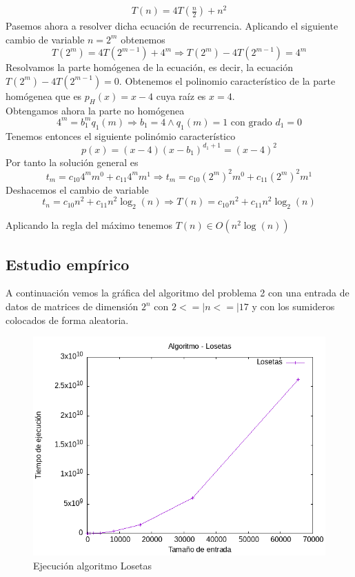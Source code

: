 \documentclass[11pt,openany]{book}
\begin{document}
\begin{gather*}
      T(n)= 4T(\frac{n}{2})+n^2
\end{gather*}
Pasemos ahora a resolver dicha ecuación de recurrencia. Aplicando el siguiente cambio de variable $n=2^m$ obtenemos
\begin{equation*}
      T(2^m)=4T(2^{m-1})+4^m \Rightarrow T(2^m)-4T(2^{m-1})=4^m
\end{equation*}
  Resolvamos la parte homógenea de la ecuación, es decir, la ecuación $T(2^m)-4T(2^{m-1})=0$. Obtenemos el polinomio
  característico de la parte homógenea que es $p_H(x)=x-4$ cuya raíz es $x=4$. \\
  Obtengamos ahora la parte no homógenea
\begin{equation*}
      4^m=b_1^m q_1(m) \Rightarrow b_1=4 \wedge q_1(m)=1 \text{ con grado } d_1=0
\end{equation*}
  Tenemos entonces el siguiente polinómio característico
\begin{equation*}
      p(x)=(x-4)(x-b_1)^{d_1+1}=(x-4)^2
\end{equation*}
  Por tanto la solución general es
\begin{equation*}
      t_m=c_{10}4^mm^0+c_{11}4^mm^1  {\Rightarrow}  t_m=c_{10}(2^{m})^2m^0+c_{11}(2^{m})^2m^1  
\end{equation*}
Deshacemos el cambio de variable
\begin{equation*}
      t_n=c_{10}n^2+c_{11}n^2\log_2(n) \Rightarrow T(n)=c_{10}n^2+c_{11}n^2\log_2(n)
\end{equation*}

  Aplicando la regla del máximo tenemos $T(n) \in O(n^2\log(n))$
\subsection{Estudio empírico}

A continuación  vemos la gráfica del algoritmo del problema 2 con una entrada de datos de matrices de dimensión $2^n$ con $2<=|n<=|17$ y con 
los sumideros colocados de forma aleatoria.
\begin{center}
      \begin{figure}[H]
            \centering
            \includegraphics[width=0.7\linewidth]{assets/Img/Losetas.png}
            \caption{Ejecución algoritmo Losetas}
            \label{fig:Viajante}
      \end{figure}
\end{center}
\end{document}
